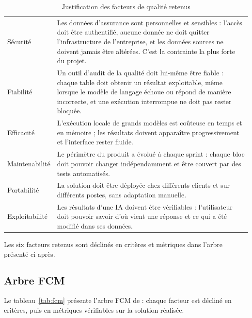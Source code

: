 \begin{table}[H]
\centering
\small
\begin{tabular}{|L{3cm}|L{11cm}|}
\hline
{} &  \\ \hline
Sécurité & Les données d'assurance sont personnelles et sensibles : l'accès doit être authentifié, aucune donnée ne doit quitter l'infrastructure de l'entreprise, et les données sources ne doivent jamais être altérées. C'est la contrainte la plus forte du projet. \\ \hline
Fiabilité & Un outil d'audit de la qualité doit lui-même être fiable : chaque table doit obtenir un résultat exploitable, même lorsque le modèle de langage échoue ou répond de manière incorrecte, et une exécution interrompue ne doit pas rester bloquée. \\ \hline
Efficacité & L'exécution locale de grands modèles est coûteuse en temps et en mémoire ; les résultats doivent apparaître progressivement et l'interface rester fluide. \\ \hline
Maintenabilité & Le périmètre du produit a évolué à chaque sprint : chaque bloc doit pouvoir changer indépendamment et être couvert par des tests automatisés. \\ \hline
Portabilité & La solution doit être déployée chez différents clients et sur différents postes, sans adaptation manuelle. \\ \hline
Exploitabilité & Les résultats d'une IA doivent être vérifiables : l'utilisateur doit pouvoir savoir d'où vient une réponse et ce qui a été modifié dans ses données. \\ \hline
\end{tabular}
\caption{Justification des facteurs de qualité retenus}
\label{tab:facteurs}
\end{table}

Les six facteurs retenus sont déclinés en critères et métriques dans l'arbre présenté ci-après.

\subsection{Arbre FCM}

Le tableau~\ref{tab:fcm} présente l'arbre FCM de \projet{} : chaque facteur est décliné en critères, puis en métriques vérifiables sur la solution réalisée.

